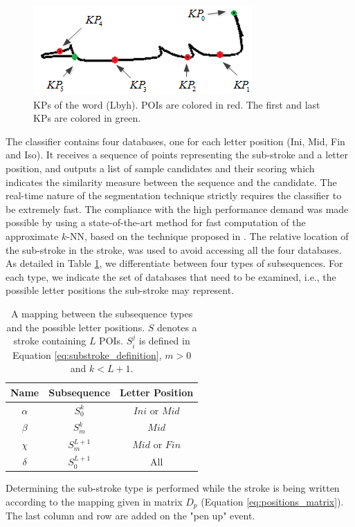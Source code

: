 \documentclass[10pt, conference, compsocconf]{IEEEtran}
\begin{document}
\begin{figure}
\centering
\includegraphics[width=0.6\columnwidth]{./figures/candidate_points}
\caption{KPs of the word  (Lbyh). POIs are colored in red. The first and last KPs are colored in green.}
\label{fig:candidate_points}
\end{figure}

The classifier contains four databases, one for each letter position (Ini, Mid, Fin and Iso). 
It receives a sequence of points representing the sub-stroke and a letter position, and outputs a list of sample candidates and their scoring which indicates the similarity measure between the sequence and the candidate.
The real-time nature of the segmentation technique strictly requires the classifier to be extremely fast.
The compliance with the high performance demand was made possible by using a state-of-the-art method for fast computation of the approximate $k$-NN, based on the technique proposed in \cite{saabni2013efficient}.
The relative location of the sub-stroke in the stroke, was used to avoid accessing all the four databases. 
As detailed in Table \ref{table:subsequences_types}, we differentiate between four types of subsequences. 
For each type, we indicate the set of databases that need to be examined, i.e., the possible letter positions the sub-stroke may represent. 

\begin{table}
\centering
\renewcommand{\arraystretch}{1.3}
\caption{A mapping between the subsequence types and the possible letter positions. $S$ denotes a stroke containing $L$ POIs. $S_i^j$ is defined in Equation \ref{eq:substroke_definition}, $m>0$ and $k<L+1$. }
\begin{tabular}{| c |c | c |}
\hline
  Name     & Subsequence    & Letter Position       \\
\hline
  $\alpha$ & $S_0^{k}$         & $Ini$ or $Mid$  \\
\hline
  $\beta$  & $S_{m}^{k}$     & $Mid$              \\
\hline
  $\chi$    & $S_{m}^{L+1}$ & $Mid$ or $Fin$   \\
\hline
  $\delta$ & $S_0^{L+1}$     & All                   \\
\hline
\end{tabular}
\label{table:subsequences_types}
\vspace{-10pt}
\end{table}
Determining the sub-stroke type is performed while the stroke is being written according to the mapping given in matrix $D_p$ (Equation \ref{eq:positions_matrix}). 
The last column and row are added on the "pen up" event.
\end{document}
